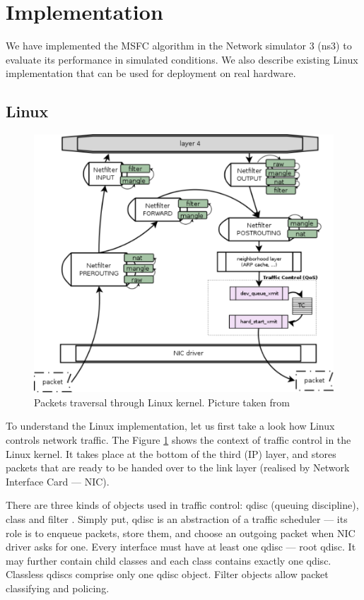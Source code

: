 \section {Implementation}

We have implemented the MSFC algorithm in the Network simulator 3 (ns3) to evaluate its performance in simulated conditions. We also describe existing Linux implementation that can be used for deployment on real hardware.

\subsection {Linux}
\begin{figure}
	\centering
	\includegraphics[width=137mm]{drawings/network_stack}
	\caption{Packets traversal through Linux kernel. Picture taken from \cite{linuxCore}}
	\label{fig12:linux}
\end{figure}

To understand the Linux implementation, let us first take a look how Linux controls network traffic. The Figure \ref{fig12:linux} shows the context of traffic control in the Linux kernel. It takes place at the bottom of the third (IP) layer, and stores packets that are ready to be handed over to the link layer (realised by Network Interface Card --- NIC).

There are three kinds of objects used in traffic control: qdisc (queuing discipline), class and filter \cite{tc}. Simply put, qdisc is an abstraction of a traffic scheduler --- its role is to enqueue packets, store them, and choose an outgoing packet when NIC driver asks for one. Every interface must have at least one qdisc --- root qdisc. It may further contain child classes and each class contains exactly one qdisc. Classless qdiscs comprise only one qdisc object. Filter objects allow packet classifying and policing.


